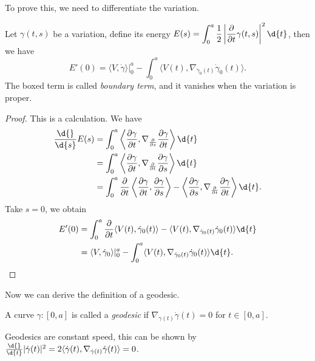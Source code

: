 To prove this, we need to differentiate the variation.
\begin{prop}
    Let $\gamma(t,s)$ be a variation, define its energy $\displaystyle E(s)=\int_0^a\frac{1}{2}\left|\frac{\partial}{\partial{t}}\gamma(t,s)\right|^2\d{t}$, then we have
    \[E'(0)=\boxed{\langle V,\dot\gamma\rangle|^a_0}-\int_0^a\langle V(t),\nabla_{\dot\gamma_0(t)}\dot\gamma_0(t)\rangle.\]
    The boxed term is called \emph{boundary term}, and it vanishes when the variation is proper.
\end{prop}
\begin{proof}
    This is a calculation.
    We have
    \begin{align*}
        \frac{\d{}}{\d{s}}E(s)&=\int_0^a\left\langle\frac{\partial\gamma}{\partial{t}},\nabla_{\frac{\partial}{\partial{s}}}\frac{\partial\gamma}{\partial{t}}\right\rangle\d{t}\\
        &=\int_0^a\left\langle\frac{\partial\gamma}{\partial{t}},\nabla_{\frac{\partial}{\partial{t}}}\frac{\partial\gamma}{\partial{s}}\right\rangle\d{t}\\
        &=\int_0^a\frac{\partial}{\partial{t}}\left\langle\frac{\partial\gamma}{\partial{t}},\frac{\partial\gamma}{\partial{s}}\right\rangle-\left\langle\frac{\partial\gamma}{\partial{s}},\nabla_{\frac{\partial{}}{\partial{t}}}\frac{\partial\gamma}{\partial{t}}\right\rangle\d{t}.
    \end{align*}
    Take $s=0$, we obtain
    \begin{align*}
        E'(0)&=\int_0^a\frac{\partial{}}{\partial{t}}\langle V(t),\dot\gamma_0(t)\rangle-\langle V(t),\nabla_{\dot\gamma_0(t)}\dot\gamma_0(t)\rangle\d{t}\\
        &=\langle V,\dot\gamma_0\rangle|^a_0-\int_0^a\langle V(t),\nabla_{\dot\gamma_0(t)}\dot\gamma_0(t)\rangle\d{t}.\qedhere
    \end{align*}
\end{proof}

Now we can derive the definition of a geodesic.
\begin{defn}
    A curve $\gamma:[0,a]$ is called a \emph{geodesic} if $\nabla_{\dot\gamma(t)}\dot\gamma(t)=0$ for $t\in[0,a]$.
\end{defn}

\begin{rem}
    Geodesics are constant speed, this can be shown by $\frac{\d{}}{\d{t}}|\dot\gamma(t)|^2=2\langle\dot\gamma(t),\nabla_{\dot\gamma(t)}\dot\gamma(t)\rangle=0$.
\end{rem}

